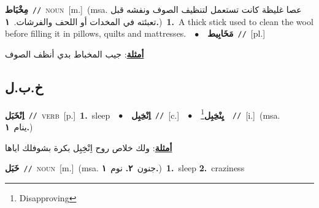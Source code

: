 \documentclass[10pt,a4paper,twoside]{article} %
\begin{document}
\begin{multicols}{2}
{\setlength\topsep{0pt}\textbf{\foreignlanguage{arabic}{مِخْبَاط}}\ {\color{gray}\texttt{//}\color{black}}\ \textsc{noun}\ [m.]\ \color{gray}(msa. \foreignlanguage{arabic}{عصا غليظة كانت تستعمل لتنظيف الصوف ونفشه قبل تعبئته في المخدات أو اللحف والفرشات.}~\foreignlanguage{arabic}{\textbf{١.}})\color{black}\ \textbf{1.}~A thick stick used to clean the wool before filling it in pillows, quilts and mattresses.\ \ $\bullet$\ \ \setlength\topsep{0pt}\textbf{\foreignlanguage{arabic}{مَخَابِيط}}\ {\color{gray}\texttt{//}\color{black}}\ [pl.]\  \begin{flushright}\color{gray}\foreignlanguage{arabic}{\textbf{\underline{\foreignlanguage{arabic}{أمثلة}}}: جيب المخباط بدي أنظف الصوف}\end{flushright}\color{black}} \vspace{2mm}

\vspace{-3mm}
\subsection*{\color{blue}\foreignlanguage{arabic}{خ.ب.ل}\color{blue}{}} 

{\setlength\topsep{0pt}\textbf{\foreignlanguage{arabic}{اِنْخَبَل}}\ {\color{gray}\texttt{//}\color{black}}\ \textsc{verb}\ [p.]\ \textbf{1.}~sleep\ \ $\bullet$\ \ \setlength\topsep{0pt}\textbf{\foreignlanguage{arabic}{اِنْخِبِل}}\ {\color{gray}\texttt{//}\color{black}}\ [c.]\ \ $\bullet$\ \ \setlength\topsep{0pt}\textbf{\foreignlanguage{arabic}{يِنْخِبِل}}\footnote{Disapproving}\ \ {\color{gray}\texttt{//}\color{black}}\ [i.]\ \color{gray}(msa. \foreignlanguage{arabic}{ينام}~\foreignlanguage{arabic}{\textbf{١.}})\color{black}\  \begin{flushright}\color{gray}\foreignlanguage{arabic}{\textbf{\underline{\foreignlanguage{arabic}{أمثلة}}}: ولك خلاص روح اِنْخِبِل بكرة بشوفلك اياها}\end{flushright}\color{black}} \vspace{2mm}

{\setlength\topsep{0pt}\textbf{\foreignlanguage{arabic}{خَبَل}}\ {\color{gray}\texttt{//}\color{black}}\ \textsc{noun}\ [m.]\ \color{gray}(msa. \foreignlanguage{arabic}{جنون}~\foreignlanguage{arabic}{\textbf{٢.}}  \foreignlanguage{arabic}{نوم}~\foreignlanguage{arabic}{\textbf{١.}})\color{black}\ \textbf{1.}~sleep  \textbf{2.}~craziness\ } \vspace{2mm}


\end{multicols}
\end{document}
